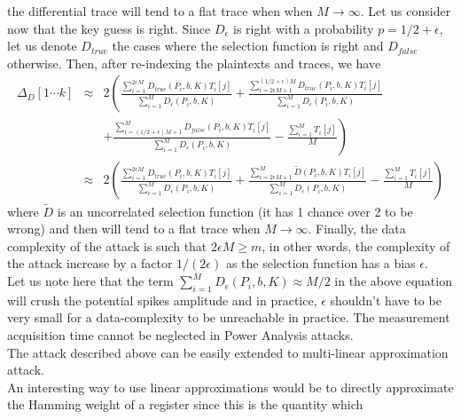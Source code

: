 \documentclass[11pt,a4paper]{article}
\begin{document}
{{{{{{{{{the differential trace will tend to a flat trace when when $M \longrightarrow \infty$. Let us consider now that the key guess is right. Since $D_{\epsilon}$ is right with a probability $p = 1/2+\epsilon$, 
let us denote $D_{true}$ the cases where the selection function is right and $D_{false}$ otherwise. Then, after re-indexing the plaintexts and traces, we have 
\begin{displaymath}
 \begin{array}{lcl}
  \Delta_D[1\cdots k] & \approx & 2 \left(\frac{ \sum^{2\epsilon M}_{i=1}D_{true}(P_i, b, K)T_i[j]}{\sum^{M}_{i=1}D_{\epsilon}(P_i, b, K)} + \frac{\sum^{(1/2+\epsilon)M}_{i=2\epsilon M+1}D_{true}(P_i, b, K)T_i[j]}{\sum^{M}_{i=1}D_{\epsilon}(P_i, b, K)} \right. \\ 
		      &         & \left. + \frac{\sum^{M}_{i=(1/2+\epsilon)M + 1}D_{false}(P_i, b, K)T_i[j]}{\sum^{M}_{i=1}D_{\epsilon}(P_i, b, K)} - \frac{\sum^{M}_{i=1}T_i[j]}{M}\right) \\
                      & \approx & 2 \left(\frac{ \sum^{2\epsilon M}_{i=1}D_{true}(P_i, b, K)T_i[j]}{\sum^{M}_{i=1}D_{\epsilon}(P_i, b, K)} + \frac{\sum^{M}_{i=2\epsilon M+1}\widetilde{D}(P_i, b, K)T_i[j]}{\sum^{M}_{i=1}D_{\epsilon}(P_i, b, K)} - \frac{\sum^{M}_{i=1}T_i[j]}{M}\right)  
 \end{array}
\end{displaymath}
where $\widetilde{D}$ is an uncorrelated selection function (it has 1 chance over 2 to be wrong) and then will tend to a flat trace when $M \longrightarrow \infty$. 
Finally, the data complexity of the attack is such that $2\epsilon M \geq m$, in other words, the complexity of the attack increase by a factor $1/(2\epsilon)$ as the 
selection function has a bias $\epsilon$.  
\vspace{1ex} \\
 Let us note here that the term $\sum^{M}_{i=1}D_{\epsilon}(P_i, b, K) \approx M/2$ in the above equation will crush the potential spikes amplitude 
and in practice, $\epsilon$ shouldn't have to be very small for a data-complexity to be unreachable in practice. The measurement acquisition time cannot be neglected in 
Power Analysis attacks. \\
 The attack described above can be easily extended to multi-linear approximation attack.
\vspace{1ex} \\
An interesting way to use linear approximations would be to directly approximate the Hamming weight of a register since this is the quantity which
}}}}}}}}}
\end{document}
